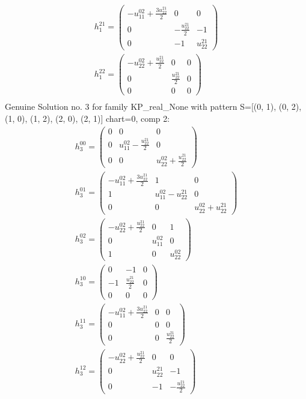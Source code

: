 \documentclass[a4paper, 11pt, twoside, onecolumn]{article}
\begin{document}
\begin{landscape}
\begin{gather*}
	 h_{1}^{21}=\begin{pmatrix}- u^{02}_{11} + \frac{3 u^{21}_{22}}{2} & 0 & 0\\0 & - \frac{u^{21}_{22}}{2} & -1\\0 & -1 & u^{21}_{22}\end{pmatrix}\\ 
	 h_{1}^{22}=\begin{pmatrix}- u^{02}_{22} + \frac{u^{21}_{22}}{2} & 0 & 0\\0 & \frac{u^{21}_{22}}{2} & 0\\0 & 0 & 0\end{pmatrix}\\ 
\end{gather*} 
Genuine Solution no. 3 for family KP_real_None with pattern S=[(0, 1), (0, 2), (1, 0), (1, 2), (2, 0), (2, 1)] chart=0, comp 2: 
\begin{gather*} 
	 h_{3}^{00}=\begin{pmatrix}0 & 0 & 0\\0 & u^{02}_{11} - \frac{u^{21}_{22}}{2} & 0\\0 & 0 & u^{02}_{22} + \frac{u^{21}_{22}}{2}\end{pmatrix}\\ 
	 h_{3}^{01}=\begin{pmatrix}- u^{02}_{11} + \frac{3 u^{21}_{22}}{2} & 1 & 0\\1 & u^{02}_{11} - u^{21}_{22} & 0\\0 & 0 & u^{02}_{22} + u^{21}_{22}\end{pmatrix}\\ 
	 h_{3}^{02}=\begin{pmatrix}- u^{02}_{22} + \frac{u^{21}_{22}}{2} & 0 & 1\\0 & u^{02}_{11} & 0\\1 & 0 & u^{02}_{22}\end{pmatrix}\\ 
	 h_{3}^{10}=\begin{pmatrix}0 & -1 & 0\\-1 & \frac{u^{21}_{22}}{2} & 0\\0 & 0 & 0\end{pmatrix}\\ 
	 h_{3}^{11}=\begin{pmatrix}- u^{02}_{11} + \frac{3 u^{21}_{22}}{2} & 0 & 0\\0 & 0 & 0\\0 & 0 & \frac{u^{21}_{22}}{2}\end{pmatrix}\\ 
	 h_{3}^{12}=\begin{pmatrix}- u^{02}_{22} + \frac{u^{21}_{22}}{2} & 0 & 0\\0 & u^{21}_{22} & -1\\0 & -1 & - \frac{u^{21}_{22}}{2}\end{pmatrix}\\ 

\end{gather*}
\end{landscape}
\end{document}
